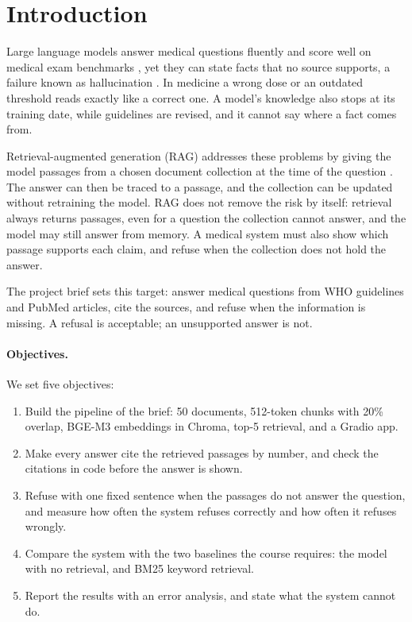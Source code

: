 \section{Introduction}
\label{sec:intro}

Large language models answer medical questions fluently and score well on medical exam benchmarks \citep{singhal2023clinical}, yet they can state facts that no source supports, a failure known as hallucination \citep{ji2023hallucination}. In medicine a wrong dose or an outdated threshold reads exactly like a correct one. A model's knowledge also stops at its training date, while guidelines are revised, and it cannot say where a fact comes from.

Retrieval-augmented generation (RAG) addresses these problems by giving the model passages from a chosen document collection at the time of the question \citep{lewis2020rag}. The answer can then be traced to a passage, and the collection can be updated without retraining the model. RAG does not remove the risk by itself: retrieval always returns passages, even for a question the collection cannot answer, and the model may still answer from memory. A medical system must also show which passage supports each claim, and refuse when the collection does not hold the answer.

The project brief sets this target: answer medical questions from WHO guidelines and PubMed articles, cite the sources, and refuse when the information is missing. A refusal is acceptable; an unsupported answer is not.

\paragraph{Objectives.} We set five objectives:
\begin{enumerate}
\item Build the pipeline of the brief: 50 documents, 512-token chunks with 20\% overlap, BGE-M3 embeddings in Chroma, top-5 retrieval, and a Gradio app.
\item Make every answer cite the retrieved passages by number, and check the citations in code before the answer is shown.
\item Refuse with one fixed sentence when the passages do not answer the question, and measure how often the system refuses correctly and how often it refuses wrongly.
\item Compare the system with the two baselines the course requires: the model with no retrieval, and BM25 keyword retrieval.
\item Report the results with an error analysis, and state what the system cannot do.
\end{enumerate}

